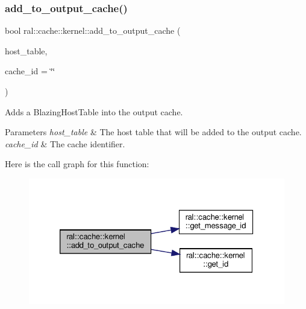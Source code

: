 \subsubsection{\texorpdfstring{add\+\_\+to\+\_\+output\+\_\+cache()}{add\_to\_output\_cache()}\hspace{0.1cm}{\footnotesize\ttfamily [3/3]}}
{\footnotesize\ttfamily bool ral\+::cache\+::kernel\+::add\+\_\+to\+\_\+output\+\_\+cache (\begin{DoxyParamCaption}\item[{std\+::unique\+\_\+ptr$<$ \hyperlink{classral_1_1frame_1_1BlazingHostTable}{ral\+::frame\+::\+Blazing\+Host\+Table} $>$}]{host\+\_\+table,  }\item[{std\+::string}]{cache\+\_\+id = {\ttfamily \char`\"{}\char`\"{}} }\end{DoxyParamCaption})}



Adds a Blazing\+Host\+Table into the output cache. 


\begin{DoxyParams}{Parameters}
{\em host\+\_\+table} & The host table that will be added to the output cache. \\
\hline
{\em cache\+\_\+id} & The cache identifier. \\
\hline
\end{DoxyParams}
Here is the call graph for this function\+:\nopagebreak
\begin{figure}[H]
\begin{center}
\leavevmode
\includegraphics[width=326pt]{classral_1_1cache_1_1kernel_a94e93c7bb81d9a3a7729fa84a7cf07c1_cgraph}
\end{center}
\end{figure}
\mbox{\label{classral_1_1cache_1_1kernel_aa8d19c5f112f8965ea2f9999fb5fd625}} 
